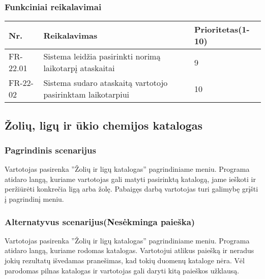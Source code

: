 \documentclass[oneside]{VUMIFPSkursinis}
\begin{document}
	\subsubsection{Funkciniai reikalavimai}
	\begin{table}[htbp]
		\begin{tabularx}{1\textwidth}{ |P{2.5cm}|X|P{3cm }| }  \hline
			Nr. & Reikalavimas & Prioritetas(1-10) \\ \hline
			FR-22.01 & Sistema leidžia pasirinkti norimą laikotarpį ataskaitai & 9 \\ \hline
			FR-22-02 & Sistema sudaro ataskaitą vartotojo pasirinktam laikotarpiui & 10 \\ \hline	
		\end{tabularx}
	\end{table}
\subsection{Žolių, ligų ir ūkio chemijos katalogas}
	\subsubsection{Pagrindinis scenarijus}
	Vartotojas pasirenka ''Žolių ir ligų katalogas'' pagrindiniame meniu. Programa atidaro langą, kuriame vartotojas gali matyti pasirinktą katalogą, jame ieškoti ir peržiūrėti konkrečia ligą arba žolę. Pabaigęs darbą vartotojas turi galimybę grįšti į pagrindinį meniu.
	\subsubsection{Alternatyvus scenarijus(Nesėkminga paieška)}
	Vartotojas pasirenka ''Žolių ir ligų katalogas'' pagrindiniame meniu. Programa atidaro langą, kuriame rodomas katalogas. Vartotojui atlikus paiešką ir neradus jokių rezultatų išvedamas pranešimas, kad tokių duomenų kataloge nėra. Vėl parodomas pilnas katalogas ir vartotojas gali daryti kitą paieškos užklausą.
\end{document}
